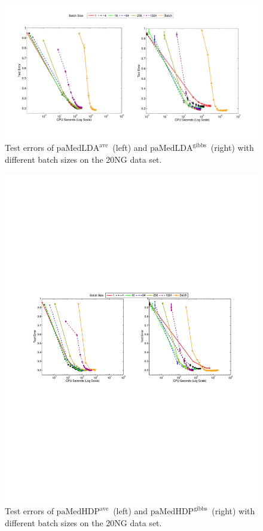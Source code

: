 \documentclass[twoside,11pt]{article}
\newcommand\paMedLDAave{$\text{paMedLDA}^{\text{ave}}$~}
\newcommand\paMedLDAgibbs{$\text{paMedLDA}^{\text{gibbs}}$~}
\newcommand\paMedHDPave{$\text{paMedHDP}^{\text{ave}}$~}
\newcommand\paMedHDPgibbs{$\text{paMedHDP}^{\text{gibbs}}$~}
\begin{document}
\begin{figure}[t]
\includegraphics[width = .95\textwidth]{plot_multic_batchsize_jmlr-eps.pdf}\vspace*{-0.2cm}
\caption{Test errors of \paMedLDAave (left) and \paMedLDAgibbs (right) with different batch sizes on the 20NG data set. }
\label{fg:multic_batchsize}\vspace*{-0.4cm}
\end{figure}
\begin{figure}[t]
\includegraphics[width = .95\textwidth]{plot_multic_batchsize_hdp_jmlr.pdf}\vspace*{-0.2cm}
\caption{Test errors of \paMedHDPave (left) and \paMedHDPgibbs (right) with different batch sizes on the 20NG data set. }
\label{fg:multic_batchsize_hdp}\vspace*{-0.2cm}
\end{figure}
\end{document}
